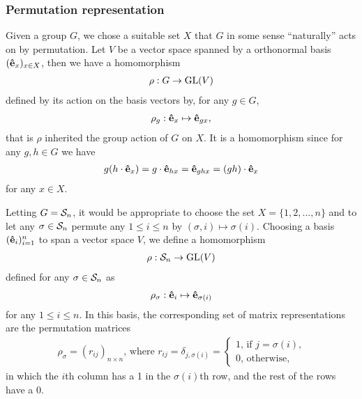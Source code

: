 \subsubsection{Permutation representation}

	Given a group $G$, we chose a suitable set $X$ that $G$ in some sense ``naturally'' acts on by permutation. Let $V$ be a vector space spanned by a orthonormal basis $(\mathbf{\hat{e}}_x)_{x \in X}$, then we have a homomorphism
	\begin{align*}
		\rho:G \rightarrow \text{GL}(V)
	\end{align*} 
	defined by its action on the basis vectors by, for any $g \in G$, 
	\begin{align*}
		\rho_g: \mathbf{\hat{e}}_x \mapsto \mathbf{\hat{e}}_{gx},
	\end{align*}
	that is $\rho$ inherited the group action of $G$ on $X$. It is a homomorphism since for any $g,h \in G$ we have
	\begin{align*}
		g(h \cdot \mathbf{\hat{e}}_x) = g \cdot \mathbf{\hat{e}}_{hx}  = \mathbf{\hat{e}}_{ghx} = (gh) \cdot \mathbf{\hat{e}}_x
	\end{align*}
	for any $x \in X$.
	
	Letting $G = \mathcal{S}_n$, it would be appropriate to choose the set $X = \{1, 2, \dots, n\}$ and to let any $\sigma \in \mathcal{S}_n$ permute any $1 \leq i \leq n$ by $(\sigma, i) \mapsto \sigma(i)$. Choosing a basis $(\mathbf{\hat{e}}_i)_{i=1}^n$ to span a vector space $V$, we define a homomorphism
	\begin{align*}
		\rho: \mathcal{S}_n \rightarrow \text{GL}(V)
	\end{align*}
	defined for any $\sigma \in \mathcal{S}_n$ as
	\begin{align*}
		\rho_\sigma: \mathbf{\hat{e}}_i \mapsto \mathbf{\hat{e}}_{\sigma(i)}
	\end{align*}
	for any $1 \leq i \leq n$. In this basis, the corresponding set of matrix representations are the permutation matrices
	\begin{align*}
		\rho_\sigma = (r_{ij})_{n \times n} \text{, where } r_{ij} = \delta_{j,\sigma(i)} = \begin{cases}
			1 \text{, if $j = \sigma(i)$,} \\
			0 \text{, otherwise,}
		\end{cases}
	\end{align*}
	in which the $i$th column has a 1 in the $\sigma(i)$th row, and the rest of the rows have a 0.
	
